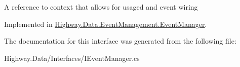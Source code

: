 A reference to context that allows for usaged and event wiring 



Implemented in \hyperlink{class_highway_1_1_data_1_1_event_management_1_1_event_manager_ac5a9cddf17fcb4c3b298b3d50431de2f}{Highway.\-Data.\-Event\-Management.\-Event\-Manager}.



The documentation for this interface was generated from the following file\-:\begin{DoxyCompactItemize}
\item 
Highway.\-Data/\-Interfaces/I\-Event\-Manager.\-cs\end{DoxyCompactItemize}

